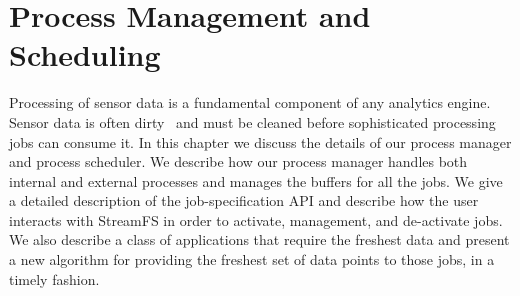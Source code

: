 \chapter{Process Management and Scheduling}
\label{chap:ProcMngtSchedMain}

Processing of sensor data is a fundamental component of any analytics engine.  Sensor data is often dirty~\cite{4160603} and
must be cleaned before sophisticated processing jobs can consume it.  
In this chapter we discuss the details of our process manager and process scheduler.  We describe how our process manager handles
both internal and external processes and manages the buffers for all the jobs.  We give a detailed description of the job-specification
API and describe how the user interacts with StreamFS in order to activate, management, and de-activate jobs.  We also 
describe a class of applications that require the freshest data and present a new algorithm for providing the freshest set of data
points to those jobs, in a timely fashion.


% 








